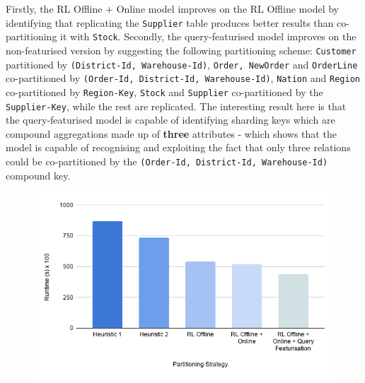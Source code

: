 Firstly, the RL Offline + Online model improves on the RL Offline model by identifying that replicating the \texttt{Supplier} table produces better results than co-partitioning it with \texttt{Stock}. Secondly, the query-featurised model improves on the non-featurised version by suggesting the following partitioning scheme: \texttt{Customer} partitioned by \texttt{(District-Id, Warehouse-Id)}, \texttt{Order, NewOrder} and \texttt{OrderLine} co-partitioned by \texttt{(Order-Id, District-Id, Warehouse-Id)}, \texttt{Nation} and \texttt{Region} co-partitioned by \texttt{Region-Key}, \texttt{Stock} and \texttt{Supplier} co-partitioned by the \texttt{Supplier-Key}, while the rest are replicated. The interesting result here is that the query-featurised model is capable of identifying sharding keys which are compound aggregations made up of \textbf{three} attributes - which shows that the model is capable of recognising and exploiting the fact that only three relations could be co-partitioned by the \texttt{(Order-Id, District-Id, Warehouse-Id)} compound key.


\begin{figure}[H]
  \centering
  \includegraphics[width=\linewidth]{figures/query-runtimes.png}
  \vspace*{-1.5\baselineskip}
  \label{fig:query-runtimes}
\end{figure}

